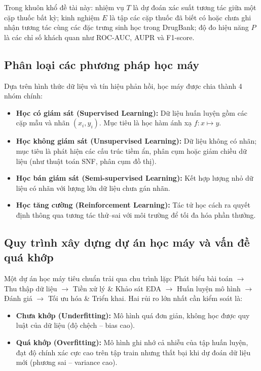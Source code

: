 \documentclass[12pt,a4paper,oneside]{report}
\begin{document}
Trong khuôn khổ đề tài này: nhiệm vụ $T$ là dự đoán xác suất tương tác giữa một cặp thuốc bất kỳ; kinh nghiệm $E$ là tập các cặp thuốc đã biết có hoặc chưa ghi nhận tương tác cùng các đặc trưng sinh học trong DrugBank; độ đo hiệu năng $P$ là các chỉ số khách quan như ROC-AUC, AUPR và F1-score.

\subsection{Phân loại các phương pháp học máy}
Dựa trên hình thức dữ liệu và tín hiệu phản hồi, học máy được chia thành 4 nhóm chính:
\begin{itemize}
  \item \textbf{Học có giám sát (Supervised Learning):} Dữ liệu huấn luyện gồm các cặp mẫu và nhãn $(x_i, y_i)$. Mục tiêu là học hàm ánh xạ $f: x \mapsto y$.
  \item \textbf{Học không giám sát (Unsupervised Learning):} Dữ liệu không có nhãn; mục tiêu là phát hiện các cấu trúc tiềm ẩn, phân cụm hoặc giảm chiều dữ liệu (như thuật toán SNF, phân cụm đồ thị).
  \item \textbf{Học bán giám sát (Semi-supervised Learning):} Kết hợp lượng nhỏ dữ liệu có nhãn với lượng lớn dữ liệu chưa gán nhãn.
  \item \textbf{Học tăng cường (Reinforcement Learning):} Tác tử học cách ra quyết định thông qua tương tác thử--sai với môi trường để tối đa hóa phần thưởng.
\end{itemize}

\subsection{Quy trình xây dựng dự án học máy và vấn đề quá khớp}
Một dự án học máy tiêu chuẩn trải qua chu trình lặp: Phát biểu bài toán $\rightarrow$ Thu thập dữ liệu $\rightarrow$ Tiền xử lý \& Khảo sát EDA $\rightarrow$ Huấn luyện mô hình $\rightarrow$ Đánh giá $\rightarrow$ Tối ưu hóa \& Triển khai. Hai rủi ro lớn nhất cần kiểm soát là:
\begin{itemize}
  \item \textbf{Chưa khớp (Underfitting):} Mô hình quá đơn giản, không học được quy luật của dữ liệu (độ chệch -- bias cao).
  \item \textbf{Quá khớp (Overfitting):} Mô hình ghi nhớ cả nhiễu của tập huấn luyện, đạt độ chính xác cực cao trên tập train nhưng thất bại khi dự đoán dữ liệu mới (phương sai -- variance cao).
\end{itemize}
\end{document}

